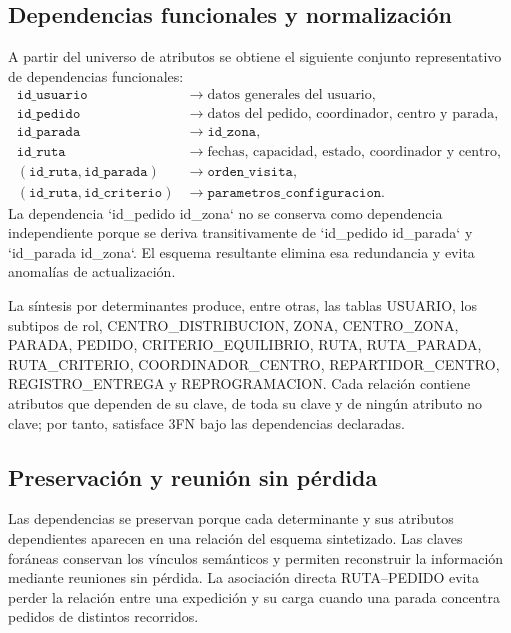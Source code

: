 \documentclass[12pt,a4paper]{article}
\newcommand{\campo}[1]{\texttt{#1}}
\begin{document}
\subsection{Dependencias funcionales y normalización}
A partir del universo de atributos se obtiene el siguiente conjunto representativo de dependencias funcionales:
\begin{align*}
\campo{id\_usuario} &\rightarrow \text{datos generales del usuario},\\
\campo{id\_pedido} &\rightarrow \text{datos del pedido, coordinador, centro y parada},\\
\campo{id\_parada} &\rightarrow \campo{id\_zona},\\
\campo{id\_ruta} &\rightarrow \text{fechas, capacidad, estado, coordinador y centro},\\
(\campo{id\_ruta},\campo{id\_parada}) &\rightarrow \campo{orden\_visita},\\
(\campo{id\_ruta},\campo{id\_criterio}) &\rightarrow \campo{parametros\_configuracion}.
\end{align*}
La dependencia `id\_pedido \textrightarrow id\_zona` no se conserva como dependencia independiente porque se deriva transitivamente de `id\_pedido \textrightarrow id\_parada` y `id\_parada \textrightarrow id\_zona`. El esquema resultante elimina esa redundancia y evita anomalías de actualización.

La síntesis por determinantes produce, entre otras, las tablas USUARIO, los subtipos de rol, CENTRO\_DISTRIBUCION, ZONA, CENTRO\_ZONA, PARADA, PEDIDO, CRITERIO\_EQUILIBRIO, RUTA, RUTA\_PARADA, RUTA\_CRITERIO, COORDINADOR\_CENTRO, REPARTIDOR\_CENTRO, REGISTRO\_ENTREGA y REPROGRAMACION. Cada relación contiene atributos que dependen de su clave, de toda su clave y de ningún atributo no clave; por tanto, satisface 3FN bajo las dependencias declaradas.

\subsection{Preservación y reunión sin pérdida}
Las dependencias se preservan porque cada determinante y sus atributos dependientes aparecen en una relación del esquema sintetizado. Las claves foráneas conservan los vínculos semánticos y permiten reconstruir la información mediante reuniones sin pérdida. La asociación directa RUTA--PEDIDO evita perder la relación entre una expedición y su carga cuando una parada concentra pedidos de distintos recorridos.
\end{document}
